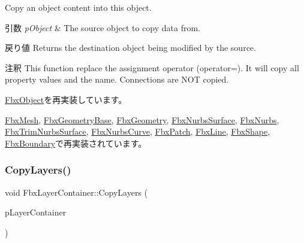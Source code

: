 Copy an object content into this object. 
\begin{DoxyParams}{引数}
{\em p\+Object} & The source object to copy data from. \\
\hline
\end{DoxyParams}
\begin{DoxyReturn}{戻り値}
Returns the destination object being modified by the source. 
\end{DoxyReturn}
\begin{DoxyRemark}{注釈}
This function replace the assignment operator (operator=). It will copy all property values and the name. Connections are N\+OT copied. 
\end{DoxyRemark}


\hyperlink{class_fbx_object_a0c0c5adb38284d14bb82c04d54504a3e}{Fbx\+Object}を再実装しています。



\hyperlink{class_fbx_mesh_a0f041743536ee5ccbc9a086e3ef1c663}{Fbx\+Mesh}, \hyperlink{class_fbx_geometry_base_a2c3754831338327259c35caebbf379d3}{Fbx\+Geometry\+Base}, \hyperlink{class_fbx_geometry_aac1cee4251e3d5fbd27f1181c58b83b3}{Fbx\+Geometry}, \hyperlink{class_fbx_nurbs_surface_a1da47f75af4920a3fb4a94690d8ada8c}{Fbx\+Nurbs\+Surface}, \hyperlink{class_fbx_nurbs_ac7c9a9018b4fdbe72b258a2fa0a3367d}{Fbx\+Nurbs}, \hyperlink{class_fbx_trim_nurbs_surface_a4407d30e83346ab3cb30ccf67d7bb289}{Fbx\+Trim\+Nurbs\+Surface}, \hyperlink{class_fbx_nurbs_curve_ad48046242c0a63d929b5440563668f79}{Fbx\+Nurbs\+Curve}, \hyperlink{class_fbx_patch_a424542a42ec75d3c5236cc366adecd89}{Fbx\+Patch}, \hyperlink{class_fbx_line_aeb9e0c53cf02d3e4e206b25c87c06256}{Fbx\+Line}, \hyperlink{class_fbx_shape_ab9776a1c0ce41830bc6841ebba4c4a23}{Fbx\+Shape}, \hyperlink{class_fbx_boundary_a6fe59f45c17eeebbabaeff235058ac70}{Fbx\+Boundary}で再実装されています。

\mbox{\label{class_fbx_layer_container_af17d86b9cd7dc836a7baf86f7292fcb2}} 
\subsubsection{\texorpdfstring{Copy\+Layers()}{CopyLayers()}}
{\footnotesize\ttfamily void Fbx\+Layer\+Container\+::\+Copy\+Layers (\begin{DoxyParamCaption}\item[{const \hyperlink{class_fbx_layer_container}{Fbx\+Layer\+Container} $\ast$}]{p\+Layer\+Container }\end{DoxyParamCaption})\hspace{0.3cm}{\ttfamily [protected]}}

